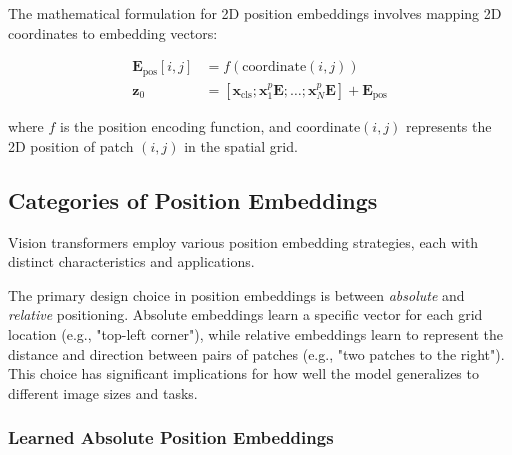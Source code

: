 The mathematical formulation for 2D position embeddings involves mapping 2D coordinates to embedding vectors:

\begin{align}
\mathbf{E}_{\text{pos}}[i,j] &= f(\text{coordinate}(i,j)) \\
\mathbf{z}_0 &= [\mathbf{x}_{\text{cls}}; \mathbf{x}_1^p\mathbf{E}; \ldots; \mathbf{x}_N^p\mathbf{E}] + \mathbf{E}_{\text{pos}}
\end{align}

where $f$ is the position encoding function, and $\text{coordinate}(i,j)$ represents the 2D position of patch $(i,j)$ in the spatial grid.

\subsection{Categories of Position Embeddings}

Vision transformers employ various position embedding strategies, each with distinct characteristics and applications.

The primary design choice in position embeddings is between \textit{absolute} and \textit{relative} positioning. Absolute embeddings learn a specific vector for each grid location (e.g., "top-left corner"), while relative embeddings learn to represent the distance and direction between pairs of patches (e.g., "two patches to the right"). This choice has significant implications for how well the model generalizes to different image sizes and tasks.

\subsubsection{Learned Absolute Position Embeddings}

